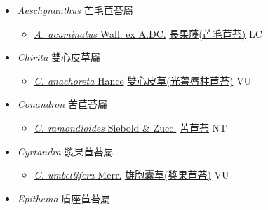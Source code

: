 
  \begin{itemize}
 \item[] \textit{Aeschynanthus} 芒毛苣苔屬
                    
  \begin{itemize}
        \item[] \href{http://www.theplantlist.org/tpl1.1/search?q=Aeschynanthus+acuminatus}{\textit{A. acuminatus} Wall. ex A.DC.}   \href{\detokenize{http://taibnet.sinica.edu.tw/chi/taibnet_species_list.php?T2=長果藤&T2_new_value=true&fr=y}}{長果藤(芒毛苣苔)}   LC
  \end{itemize}
 \item[] \textit{Chirita} 雙心皮草屬
                    
  \begin{itemize}
        \item[] \href{http://www.theplantlist.org/tpl1.1/search?q=Chirita+anachoreta}{\textit{C. anachoreta} Hance}   \href{\detokenize{http://taibnet.sinica.edu.tw/chi/taibnet_species_list.php?T2=雙心皮草&T2_new_value=true&fr=y}}{雙心皮草(光萼唇柱苣苔)}   VU
  \end{itemize}
 \item[] \textit{Conandron} 苦苣苔屬
                    
  \begin{itemize}
        \item[] \href{http://www.theplantlist.org/tpl1.1/search?q=Conandron+ramondioides}{\textit{C. ramondioides} Siebold \& Zucc.}   \href{\detokenize{http://taibnet.sinica.edu.tw/chi/taibnet_species_list.php?T2=苦苣苔&T2_new_value=true&fr=y}}{苦苣苔} NT
  \end{itemize}
 \item[] \textit{Cyrtandra} 漿果苣苔屬
                    
  \begin{itemize}
        \item[] \href{http://www.theplantlist.org/tpl1.1/search?q=Cyrtandra+umbellifera}{\textit{C. umbellifera} Merr.}   \href{\detokenize{http://taibnet.sinica.edu.tw/chi/taibnet_species_list.php?T2=雄胞囊草&T2_new_value=true&fr=y}}{雄胞囊草(槳果苣苔)}   VU
  \end{itemize}
 \item[] \textit{Epithema} 盾座苣苔屬
                    

\end{itemize}
